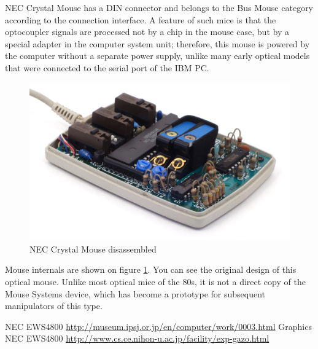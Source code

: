\documentclass[11pt, a4paper]{article}
\begin{document}
NEC Crystal Mouse has a DIN connector and belongs to the Bus Mouse category according to the connection interface. A feature of such mice is that the optocoupler signals are processed not by a chip in the mouse case, but by a special adapter in the computer system unit; therefore, this mouse is powered by the computer without a separate power supply, unlike many early optical models that were connected to the serial port of the IBM PC.

\begin{figure}[h]
    \centering
    \includegraphics[scale=0.8]{1986_nec_crystal_mouse/necraz_60.jpg}
    \caption{NEC Crystal Mouse disassembled}
    \label{fig:NecCrystalInside}
\end{figure}

Mouse internals are shown on figure \ref{fig:NecCrystalInside}. You can see the original design of this optical mouse. Unlike most optical mice of the 80s, it is not a direct copy of the Mouse Systems device, which has become a prototype for subsequent manipulators of this type.

\begin{thebibliography}{9}
 NEC EWS4800 \url{http://museum.ipsj.or.jp/en/computer/work/0003.html}
 Graphics NEC EWS4800 \url{http://www.cs.ce.nihon-u.ac.jp/facility/exp-gazo.html}
\end{thebibliography}
\end{document}
